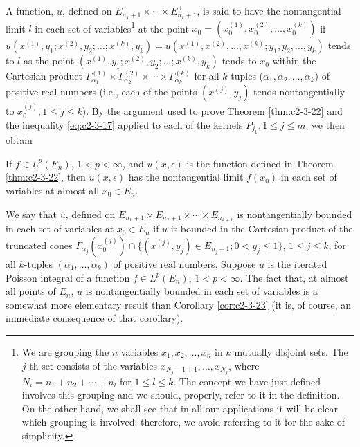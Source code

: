 A function, $u$, defined on $E_{n_1+1}^+ \times \cdots \times E_{n_k+1}^+$, is said to have the nontangential limit $l$ in each set of variables\footnote{We are grouping the $n$ variables $x_1, x_2, \ldots, x_n$ in $k$ mutually disjoint sets. The $j$-th set consists of the variables $x_{N_j-1+1}, \ldots, x_{N_j}$, where $N_i = n_1 + n_2 + \cdots + n_l$ for $1 \leq l \leq k$. The concept we have just defined involves this grouping and we should, properly, refer to it in the definition. On the other hand, we shall see that in all our applications it will be clear which grouping is involved; therefore, we avoid referring to it for the sake of simplicity.} at the point $x_0 = (x_0^{(1)}, x_0^{(2)}, \ldots, x_0^{(k)})$ if $u(x^{(1)}, y_1; x^{(2)}, y_2; \ldots; x^{(k)}, y_k) = u(x^{(1)}, x^{(2)}, \ldots, x^{(k)}; y_1, y_2, \ldots, y_k)$ tends to $l$ as the point $(x^{(1)}, y_1; x^{(2)}, y_2; \ldots; x^{(k)}, y_k)$ tends to $x_0$ within the Cartesian product $\Gamma_{\alpha_1}^{(1)} \times \Gamma_{\alpha_2}^{(2)} \times \cdots \times \Gamma_{\alpha_k}^{(k)}$ for all $k$-tuples ($\alpha_1, \alpha_2, \ldots, \alpha_k$) of positive real numbers (i.e., each of the points $(x^{(j)}, y_j)$ tends nontangentially to $x_0^{(j)}, 1 \leq j \leq k$). By the argument used to prove Theorem \ref{thm:c2-3-22} and the inequality \eqref{eq:c2-3-17} applied to each of the kernels $P_{j_1}, 1 \leq j \leq m$, we then obtain

\begin{corollary}
\label{cor:c2-3-23}
If $f \in L^p(E_n)$, $1 < p < \infty$, and $u(x, \epsilon)$ is the function defined in Theorem \eqref{thm:c2-3-22}, then $u(x, \epsilon)$ has the nontangential limit $f(x_0)$ in each set of variables at almost all $x_0 \in E_n$.
\end{corollary}

We say that $u$, defined on $E_{n_1+1} \times E_{n_2+1} \times \cdots \times E_{n_{k+1}}$ is nontangentially bounded in each set of variables at $x_0 \in E_n$ if $u$ is bounded in the Cartesian product of the truncated cones $\Gamma_{\alpha_j}(x_0^{(j)}) \cap \{(x^{(j)}, y_j) \in E_{n_j+1}; 0 < y_j \leq 1\}$, $1 \leq j \leq k$, for all $k$-tuples $(\alpha_1, \ldots, \alpha_k)$ of positive real numbers. Suppose $u$ is the iterated Poisson integral of a function $f \in L^p(E_n)$, $1 < p < \infty$. The fact that, at almost all points of $E_n$, $u$ is nontangentially bounded in each set of variables is a somewhat more elementary result than Corollary \ref{cor:c2-3-23} (it is, of course, an immediate consequence of that corollary).

